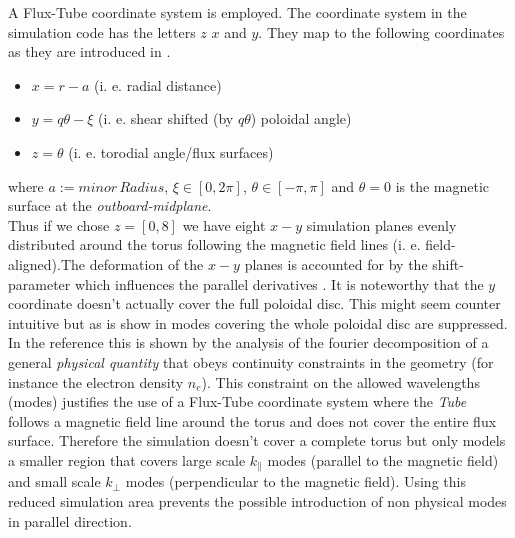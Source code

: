 \documentclass[master.tex]{subfiles}
\begin{document}
A Flux-Tube coordinate system is employed.
The coordinate system in the simulation code has the letters $z$ $x$ and $y$. They map to the following coordinates as they are introduced in \cite{doi:10.1063/1.1335832}.
\begin{itemize}
    \item $x = r - a$   (i. e. radial distance)
    \item $y = q\theta - \xi$ (i. e. shear shifted (by $q\theta$) poloidal angle)
    \item $z = \theta$ (i. e. torodial angle/flux surfaces)
\end{itemize} 
where $a:=minor\, Radius$, $\xi \in [0,2\pi]$, $\theta \in [-\pi,\pi]$ and $\theta = 0$ is the magnetic surface at the \textit{outboard-midplane}.\\
Thus if we chose $z=[0,8]$ we have eight $x-y$ simulation planes evenly distributed around the torus following the magnetic field lines (i. e. field-aligned).The deformation of the $x-y$ planes is accounted for by the shift-parameter which influences the parallel derivatives \cite{ScootShiftedMetric}.\newline
It is noteworthy that the $y$ coordinate doesn't actually cover the full poloidal disc. This might seem counter intuitive but as is show in \cite{ScottFluxTube} modes covering the whole poloidal disc are suppressed. In the reference this is shown by the analysis of the fourier decomposition of a general \textit{physical quantity} that obeys continuity constraints in the geometry (for instance the electron density $n_e$).
This constraint on the allowed wavelengths (modes) justifies the use of a Flux-Tube coordinate system where the \textit{Tube} follows a magnetic field line around the torus and does not cover the entire flux surface. Therefore the simulation doesn't cover a complete torus but only models a smaller region that covers large scale $k_\parallel$ modes (parallel to the magnetic field) and small scale $k_\perp$ modes (perpendicular to the magnetic field). Using this reduced simulation area prevents the possible introduction of non physical modes in parallel direction.
\end{document}
